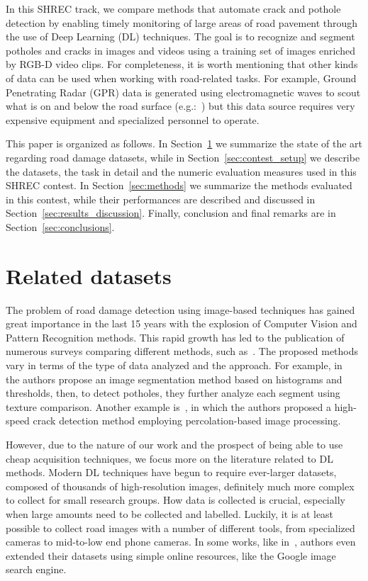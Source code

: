 \documentclass[twocolumn]{article}
\begin{document}
In this SHREC track, we compare methods that automate crack and pothole detection by enabling timely monitoring of large areas of road pavement through the use of Deep Learning (DL) techniques.
The goal is to recognize and segment potholes and cracks in images and videos using a training set of images enriched by RGB-D video clips. For completeness, it is worth mentioning that other kinds of data can be used when working with road-related tasks. For example, Ground Penetrating Radar (GPR) data is generated using electromagnetic waves to scout what is on and below the road surface (e.g.:~\cite{TONG2017}) but this data source requires very expensive equipment and specialized personnel to operate.

This paper is organized as follows. In Section~\ref{sec:related_works} we summarize the state of the art regarding road damage datasets, while in Section~\ref{sec:contest_setup} we describe the datasets, the task in detail and the numeric evaluation measures used in this SHREC contest. In Section~\ref{sec:methods} we summarize the methods evaluated in this contest, while their performances are described and discussed in Section~\ref{sec:results_discussion}. Finally, conclusion and final remarks are in Section~\ref{sec:conclusions}.

\section{Related datasets}
\label{sec:related_works}
The problem of road damage detection using image-based techniques has gained great importance in the last 15 years with the explosion of Computer Vision and Pattern Recognition methods. This rapid growth has led to the publication of numerous surveys comparing different methods, such as~\cite{Kim2014ReviewAA,Zakeri2017,ali2022bibliometric}. The proposed methods vary in terms of the type of data analyzed and the approach. For example, in~\cite{KOCH2011507} the authors propose an image segmentation method based on histograms and thresholds, then, to detect potholes, they further analyze each segment using texture comparison. Another example is~\cite{Yamaguchi2010}, in which the authors proposed a high-speed crack detection method employing percolation-based image processing.

However, due to the nature of our work and the prospect of being able to use cheap acquisition techniques, we focus more on the literature related to DL methods.
Modern DL techniques have begun to require ever-larger datasets, composed of thousands of high-resolution images, definitely much more complex to collect for small research groups.
How data is collected is crucial, especially when large amounts need to be collected and labelled. Luckily, it is at least possible to collect road images with a number of different tools, from specialized cameras to mid-to-low end phone cameras. In some works, like in~\cite{Koch2011}, authors even extended their datasets using simple online resources, like the Google image search engine.
\end{document}
